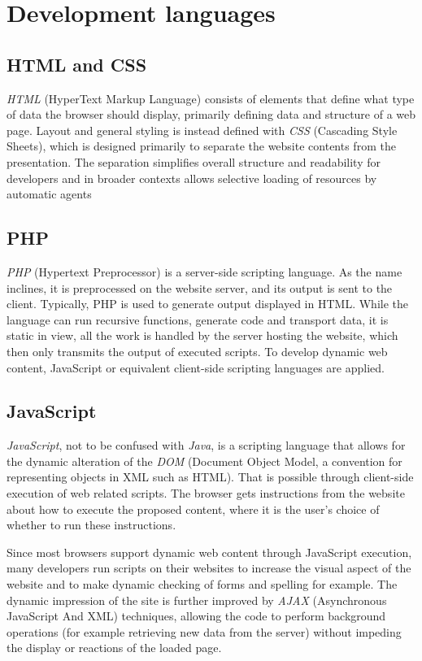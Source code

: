 \section{Development languages}
\subsection*{HTML and CSS}
\label{program_tools_html_css}
\emph{HTML} (HyperText Markup Language) consists of elements that define what type of data the browser should display, primarily defining data and structure of a web page. Layout and general styling is instead defined with \emph{CSS} (Cascading Style Sheets), which is designed primarily to separate the website contents from the presentation.
The separation simplifies overall structure and readability for developers and in broader contexts allows selective loading of resources by automatic agents\cite{html}\cite{css}

\subsection*{PHP}
\emph{PHP} (Hypertext Preprocessor) is a server-side scripting language. As the name inclines, it is preprocessed on the website server, and its output is sent to the client. Typically, PHP is used to generate output displayed in HTML. While the language can run recursive functions, generate code and transport data, it is static in view, all the work is handled by the server hosting the website, which then only transmits the output of executed scripts. To develop dynamic web content, JavaScript or equivalent client-side scripting languages are applied.\cite{php}

\subsection*{JavaScript}
\emph{JavaScript}, not to be confused with \emph{Java}, is a scripting language that allows for the dynamic alteration of the \emph{DOM} (Document Object Model, a convention for representing objects in XML such as HTML). That is possible through client-side execution of web related scripts. The browser gets instructions from the website about how to execute the proposed content, where it is the user's choice of whether to run these instructions. \cite{javascript}

Since most browsers support dynamic web content through JavaScript execution, many developers run scripts on their websites to increase the visual aspect of the website and to make dynamic checking of forms and spelling for example\cite{javascript}. The dynamic impression of the site is further improved by \emph{AJAX} (Asynchronous JavaScript And XML) techniques, allowing the code to perform background operations (for example retrieving new data from the server) without impeding the display or reactions of the loaded page.

